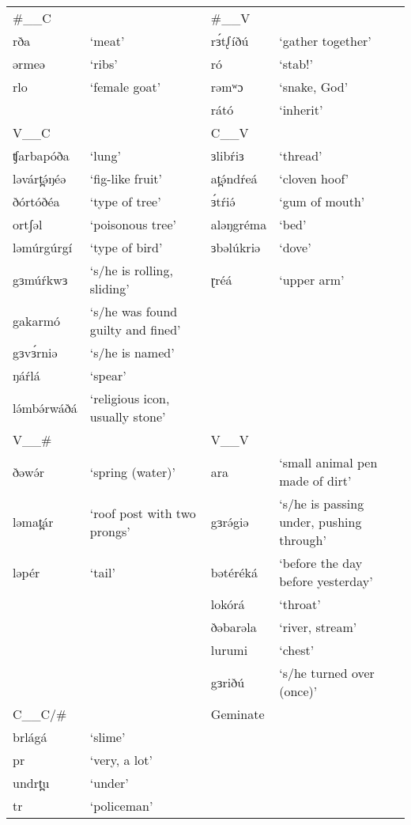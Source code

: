 \ea 
\begin{supertabular}[t]{lp{3cm}lp{3cm}}	
\#\_\_C	&&		\#\_\_V		\\
rða		&‘meat’			&rɜ́tᶘíðú	&‘gather together’\\
ərmeə	&‘ribs’			&ró			&‘stab!’\\
rlo		&‘female goat’	&rəmʷɔ		&‘snake, God’\\
						&&rátó		&‘inherit’\\
\midrule
V\_\_C		&&	C\_\_V	\\
\midrule
ʧarbapóða	&‘lung’				&ɜlibŕiɜ	&‘thread’\\
ləvárt̪ə́ŋéə	&‘fig-like fruit’	&at̪ə́ndŕeá	&‘cloven hoof’\\
ðórtóðéa	&‘type of tree’		&ɜ́tŕiə́		&‘gum of mouth’\\
ortʃəl		&‘poisonous tree’	&aləŋgréma	&‘bed’\\
ləmúrgúrgí	&‘type of bird’		&ɜbəlúkriə	&‘dove’\\
gɜmúŕkwɜ	&‘s/he is rolling, sliding’		&ɽréá	&‘upper arm’\\
gakarmó		&‘s/he was found guilty and fined’			\\
gɜvɜ́rniə	&‘s/he is named’			\\
ŋáŕlá		&‘spear’			\\
lə́mbə́rwáðá	&‘religious icon, usually stone’			\\
\midrule
V\_\_\# 	&&		V\_\_V	\\
\midrule
ðəwə́r	&‘spring (water)’		&ara	&‘small animal pen made of dirt’\\
ləmat̪ár	&‘roof post with two prongs’		&gɜrə́giə	&‘s/he is passing under, pushing through’\\
ləpér	&‘tail’		&bətéréká	&‘before the day before yesterday’\\
							&&lokórá &‘throat’\\
							&&ðəbarəla	&‘river, stream’\\
							&&lurumi		&‘chest’\\
							&&gɜriðú	&‘s/he turned over (once)’\\
\midrule
C\_\_C/\# &&			Geminate	\\
\midrule
brlágá	&‘slime’		\\	
pr		&‘very, a lot’\\			
undrt̪u	&‘under’	\\		
tr		&‘policeman’\\
\end{supertabular}\label{ex:ch2:40}			
\z 

